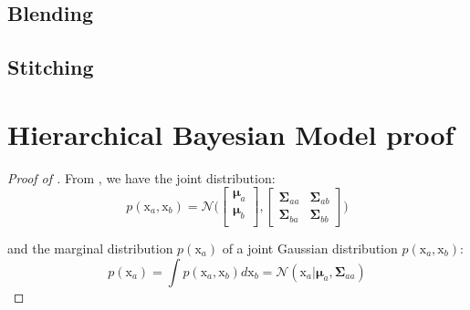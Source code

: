 \documentclass{article}
\begin{document}
\subsection{Blending}
\subsection{Stitching}







\appendix
\section{Hierarchical Bayesian Model proof}

\begin{proof}[Proof of ]\label{proof:HBM}
From \citep{deisenroth2020mathematics}, we have the joint distribution:
\begin{equation}
  p(\bm{\mathrm{x}}_{a}, \bm{\mathrm{x}}_{b}) = \mathcal{N}\Bigg(
  \begin{bmatrix}
    \bm{\mu}_{a} \\
    \bm{\mu}_{b} \\
  \end{bmatrix},
  \begin{bmatrix}
    \bm{\Sigma}_{aa} & \bm{\Sigma}_{ab}  \\
    \bm{\Sigma}_{ba} & \bm{\Sigma}_{bb}
  \end{bmatrix}
  \Bigg)\label{eq:joint-distrib}
\end{equation}

and the marginal distribution $p(\bm{\mathrm{x}}_{a})$ of a joint Gaussian distribution $p(\bm{\mathrm{x}}_{a}, \bm{\mathrm{x}}_{b})$:
\begin{equation}
  p(\bm{\mathrm{x}}_{a}) = \int p(\bm{\mathrm{x}}_{a}, \bm{\mathrm{x}}_{b}) d \bm{\mathrm{x}}_{b} = \mathcal{N}( \bm{\mathrm{x}}_{a} | \bm{\mu}_{a}, \bm{\Sigma}_{aa})
\end{equation}


\end{proof}
\end{document}
